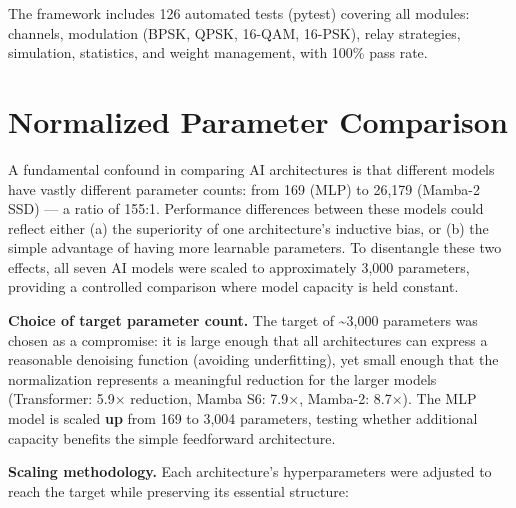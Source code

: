 The framework includes 126 automated tests (pytest) covering all modules: channels, modulation (BPSK, QPSK, 16-QAM, 16-PSK), relay strategies, simulation, statistics, and weight management, with 100\% pass rate.

\section{Normalized Parameter Comparison}\label{sec:normalized-parameter-comparison}

A fundamental confound in comparing AI architectures is that different models have vastly different parameter counts: from 169 (MLP) to 26,179 (Mamba-2 SSD) --- a ratio of 155:1. Performance differences between these models could reflect either (a) the superiority of one architecture's inductive bias, or (b) the simple advantage of having more learnable parameters. To disentangle these two effects, all seven AI models were scaled to approximately 3,000 parameters, providing a controlled comparison where model capacity is held constant.

\textbf{Choice of target parameter count.} The target of \textasciitilde3,000 parameters was chosen as a compromise: it is large enough that all architectures can express a reasonable denoising function (avoiding underfitting), yet small enough that the normalization represents a meaningful reduction for the larger models (Transformer: 5.9× reduction, Mamba S6: 7.9×, Mamba-2: 8.7×). The MLP model is scaled \textbf{up} from 169 to 3,004 parameters, testing whether additional capacity benefits the simple feedforward architecture.

\textbf{Scaling methodology.} Each architecture's hyperparameters were adjusted to reach the target while preserving its essential structure:

